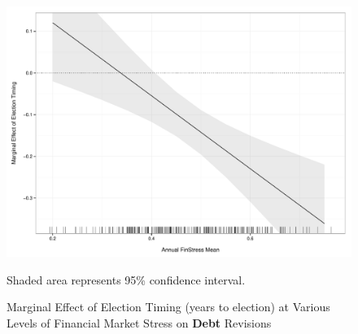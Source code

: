 \documentclass[]{article}
\begin{document}
\begin{landscape}
    
\end{landscape}

\begin{landscape}
    
\end{landscape}


\begin{figure}
    \caption{Marginal Effect of Election Timing (years to election) at Various Levels of Financial Market Stress on \textbf{Debt} Revisions}
    \label{me_finstress_elect}

    \begin{center}
        \includegraphics[scale=0.4]{figures/finstress_elect_me.pdf}
    \end{center}

	{\scriptsize{Shaded area represents 95\% confidence interval.}}

\end{figure}
\end{document}
